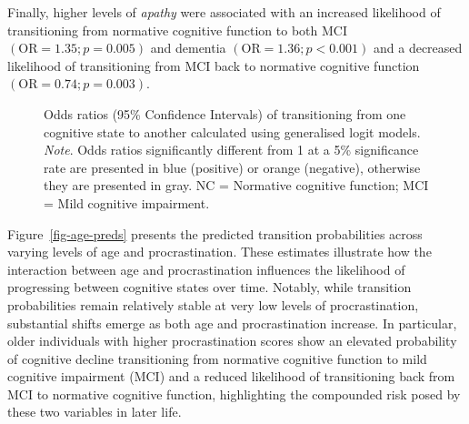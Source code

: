 \documentclass[
]{article}
\begin{document}
Finally, higher levels of \emph{apathy} were associated with an
increased likelihood of transitioning from normative cognitive function
to both MCI \((\text{OR} = 1.35; p = 0.005)\) and dementia
\((\text{OR} = 1.36; p<0.001)\) and a decreased likelihood of
transitioning from MCI back to normative cognitive function
\((\text{OR} = 0.74; p = 0.003)\).

\begin{figure}


\caption{\label{fig-markov}Odds ratios (95\% Confidence Intervals) of
transitioning from one cognitive state to another calculated using
generalised logit models. \emph{Note}. Odds ratios significantly
different from 1 at a 5\% significance rate are presented in blue
(positive) or orange (negative), otherwise they are presented in gray.
NC = Normative cognitive function; MCI = Mild cognitive impairment.}

\end{figure}%

Figure~\ref{fig-age-preds} presents the predicted transition
probabilities across varying levels of age and procrastination. These
estimates illustrate how the interaction between age and procrastination
influences the likelihood of progressing between cognitive states over
time. Notably, while transition probabilities remain relatively stable
at very low levels of procrastination, substantial shifts emerge as both
age and procrastination increase. In particular, older individuals with
higher procrastination scores show an elevated probability of cognitive
decline transitioning from normative cognitive function to mild
cognitive impairment (MCI) and a reduced likelihood of transitioning
back from MCI to normative cognitive function, highlighting the
compounded risk posed by these two variables in later life.
\end{document}
